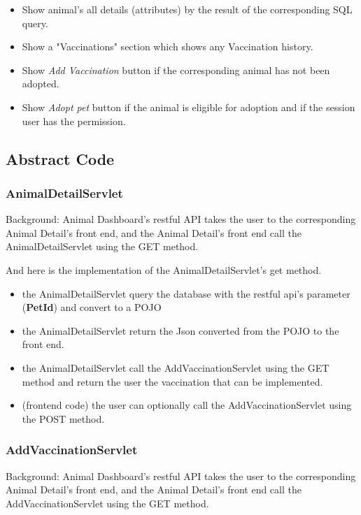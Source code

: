 \documentclass[a4paper]{article}
\begin{document}
\begin{itemize}
	\item Show animal's all details (attributes) by the result of the corresponding SQL query.
	\item Show a "Vaccinations" section which shows any Vaccination history.
	\item Show \textit{Add Vaccination} button if the corresponding animal has not been adopted.
	\item Show \textit {Adopt pet} button if the animal is eligible for adoption and if the session user has the permission.
\end{itemize}


\subsection*{Abstract Code}

\subsubsection*{AnimalDetailServlet}

Background: Animal Dashboard's restful API takes the user to the corresponding Animal Detail's front end, and the Animal Detail's front end call the AnimalDetailServlet using the GET method.

And here is the implementation of the AnimalDetailServlet's get method.
\begin{itemize}
	\item the AnimalDetailServlet query the database with the restful api's parameter (\textbf{PetId}) and convert to a POJO
	\item the AnimalDetailServlet return the Json converted from the POJO to the front end.
	\item the AnimalDetailServlet call the AddVaccinationServlet using the GET method and return the user the vaccination that can be implemented.
	\item (frontend code) the user can optionally call the AddVaccinationServlet using the POST method.
\end{itemize}


\subsubsection*{AddVaccinationServlet}

Background: Animal Dashboard's restful API takes the user to the corresponding Animal Detail's front end, and the Animal Detail's front end call the AddVaccinationServlet using the GET method.
\end{document}
